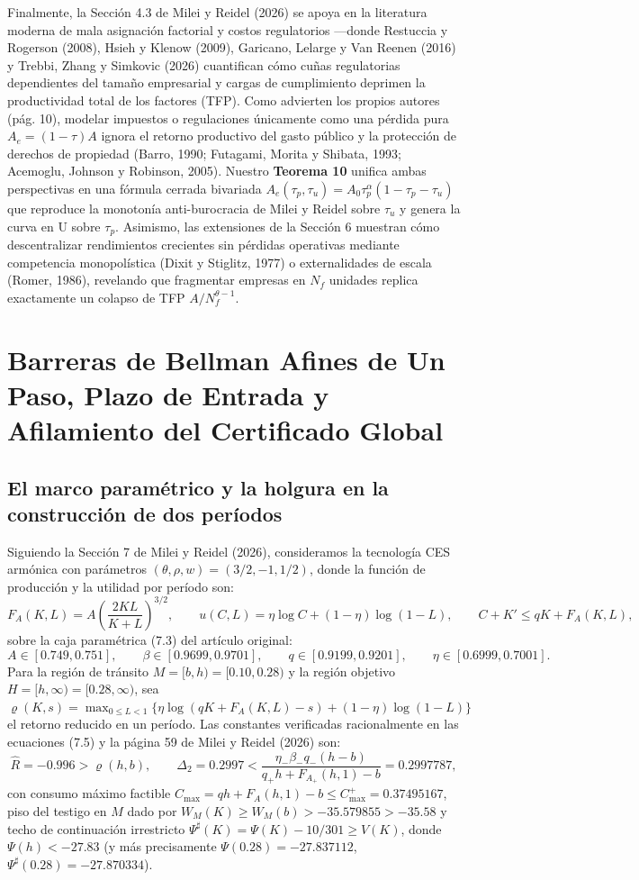 \documentclass[11pt,letterpaper]{article}
\theoremstyle{plain}
\begin{document}
Finalmente, la Sección 4.3 de Milei y Reidel (2026) se apoya en la literatura moderna de mala asignación factorial y costos regulatorios ---donde Restuccia y Rogerson (2008), Hsieh y Klenow (2009), Garicano, Lelarge y Van Reenen (2016) y Trebbi, Zhang y Simkovic (2026) cuantifican cómo cuñas regulatorias dependientes del tamaño empresarial y cargas de cumplimiento deprimen la productividad total de los factores (TFP). Como advierten los propios autores (pág. 10), modelar impuestos o regulaciones únicamente como una pérdida pura $A_e=(1-\tau)A$ ignora el retorno productivo del gasto público y la protección de derechos de propiedad (Barro, 1990; Futagami, Morita y Shibata, 1993; Acemoglu, Johnson y Robinson, 2005). Nuestro \textbf{Teorema 10} unifica ambas perspectivas en una fórmula cerrada bivariada $A_e(\tau_p,\tau_u)=A_0\tau_p^\alpha(1-\tau_p-\tau_u)$ que reproduce la monotonía anti-burocracia de Milei y Reidel sobre $\tau_u$ y genera la curva en U sobre $\tau_p$. Asimismo, las extensiones de la Sección 6 muestran cómo descentralizar rendimientos crecientes sin pérdidas operativas mediante competencia monopolística (Dixit y Stiglitz, 1977) o externalidades de escala (Romer, 1986), revelando que fragmentar empresas en $N_f$ unidades replica exactamente un colapso de TFP $A/N_f^{\theta-1}$.

\section{Barreras de Bellman Afines de Un Paso, Plazo de Entrada y Afilamiento del Certificado Global}

\subsection{El marco paramétrico y la holgura en la construcción de dos períodos}

Siguiendo la Sección 7 de Milei y Reidel (2026), consideramos la tecnología CES armónica con parámetros $(\theta,\rho,w)=(3/2,-1,1/2)$, donde la función de producción y la utilidad por período son:
\[
F_A(K,L) = A\left(\frac{2KL}{K+L}\right)^{3/2}, \qquad u(C,L) = \eta\log C + (1-\eta)\log(1-L), \qquad C + K' \le qK + F_A(K,L),
\]
sobre la caja paramétrica (7.3) del artículo original:
\[
A\in[0.749,0.751], \qquad \beta\in[0.9699,0.9701], \qquad q\in[0.9199,0.9201], \qquad \eta\in[0.6999,0.7001].
\]
Para la región de tránsito $M=[b,h)=[0.10,0.28)$ y la región objetivo $H=[h,\infty)=[0.28,\infty)$, sea $\varrho(K,s)=\max_{0\le L<1}\{\eta\log(qK+F_A(K,L)-s)+(1-\eta)\log(1-L)\}$ el retorno reducido en un período. Las constantes verificadas racionalmente en las ecuaciones (7.5) y la página 59 de Milei y Reidel (2026) son:
\[
\widehat{R} = -0.996 > \varrho(h,b), \qquad \Delta_2 = 0.2997 < \frac{\eta_-\beta_-q_-(h-b)}{q_+ h + F_{A_+}(h,1)-b} = 0.2997787,
\]
con consumo máximo factible $C_{\max}=qh+F_A(h,1)-b \le C_{\max}^+ = 0.37495167$, piso del testigo en $M$ dado por $W_M(K)\ge W_M(b) > -35.579855 > -35.58$ y techo de continuación irrestricto $\Psi^\sharp(K)=\Psi(K)-10/301\ge V(K)$, donde $\Psi(h)<-27.83$ (y más precisamente $\Psi(0.28)=-27.837112$, $\Psi^\sharp(0.28)=-27.870334$).
\end{document}
